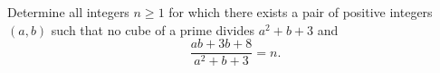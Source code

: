 Determine all integers $n \geq 1$ for which there exists a pair of positive integers $(a, b)$ such that no cube of a prime divides $a^2 + b + 3$ and
\[
\frac{ab + 3b + 8}{a^2 + b + 3} = n.
\]
